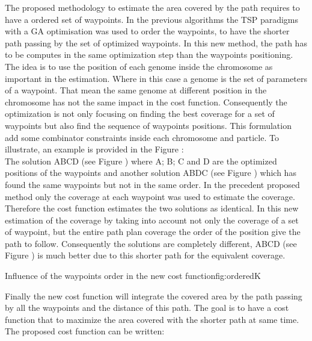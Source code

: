 The proposed methodology to estimate the area covered by the path requires to have a ordered set of waypoints.  In the previous algorithms the TSP paradigms with a GA optimisation was used to order the waypoints, to have the shorter path passing by the set of optimized waypoints. In this new method, the path has to be computes in the same optimization step than the waypoints positioning. 
The idea is to use the position of each genome inside the chromosome as important in the estimation. Where in this case a genome is the set of parameters of a waypoint. That mean the same genome at different position in the chromosome has not the same impact in the cost function. Consequently the optimization is not only focusing on finding the best coverage for a set of waypoints but also find the sequence of waypoints positions. This formulation add some combinator constraints inside each chromosome and particle.
To illustrate, an example is provided in the Figure  : \\
The solution ABCD (see Figure ) where A; B; C and D are the optimized positions of the waypoints and another solution  ABDC (see Figure ) which has found the same waypoints but not in the same order. In the precedent proposed method only the coverage at each waypoint was used to estimate the coverage. Therefore the cost function estimates the two solutions as identical. 
In this new estimation of the coverage by taking into account not only the coverage of a set of waypoint, but the entire path plan coverage the order of the position give the path to follow. Consequently the solutions are completely different, ABCD (see Figure ) is much better due to this shorter path for the equivalent coverage.
  \begin{mfigures}[!]{Influence of the waypoints order in the new cost function}{fig:orderedK} \centering
\end{mfigures}   

 Finally the new cost function will integrate the covered area by the path passing  by all the waypoints and the distance of this path. The goal is to have a cost function that to maximize the area covered with the shorter path at same time.
 The proposed cost function can be written:
 
